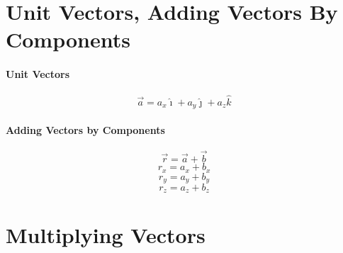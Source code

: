 \documentclass{article}
\begin{document}
    \section{Unit Vectors, Adding Vectors By Components}

        \paragraph{Unit Vectors}
        \begin{equation}
            \vec{a} = a_x \hat{\imath} + a_y \hat{\jmath} + a_z \hat{k}
        \end{equation}

        \paragraph{Adding Vectors by Components}
        \begin{equation}
            \vec{r} = \vec{a} + \vec{b} \nonumber
        \end{equation}
        \begin{equation}
            r_x = a_x + b_x
        \end{equation}
        \begin{equation}
            r_y = a_y + b_y
        \end{equation}
        \begin{equation}
            r_z = a_z + b_z
        \end{equation}

    \section{Multiplying Vectors}
\end{document}

